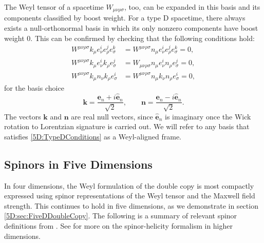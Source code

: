 The Weyl tensor of a spacetime $W_{\mu \nu \rho \sigma}$, too, can be expanded in this basis and its components
classified by boost weight. For a type D spacetime, there always exists a null-orthonormal basis in which its only
nonzero components have boost weight $0$. This can be confirmed by checking that the following conditions hold:
\cite{Hamamoto:2006zf}
\begin{equation} \label{5D:TypeDConditions} 
    \begin{split}
        W^{\mu \nu \rho \sigma} k_{\mu} e_{\nu}^{i} e_{\rho}^{j} e_{\sigma}^{k} &= W^{\mu \nu \rho \sigma}
        n_{\mu}e_{\nu}^{i} e_{\rho}^{j} e_{\sigma}^{k} = 0, \\
        W^{\mu \nu \rho \sigma} k_{\mu} e_{\nu}^{i} k_{\rho}e_{\sigma}^{j} &= W_{\mu \nu \rho \sigma} n_{\mu}
        e_{\nu}^{i} n_{\rho} e_{\sigma}^{j} = 0, \\
        W^{\mu \nu \rho \sigma} k_{\mu} n_{\nu}k_{\rho} e_{\sigma}^{i} &= W^{\mu \nu \rho \sigma} n_{\mu}
        k_{\nu}n_{\rho} e_{\sigma}^{i} = 0,
    \end{split}
\end{equation}
%
for the basis choice
%
\begin{equation} 
    \mathbf{k} = \frac{\mathbf{e}_{n} + i \mathbf{\hat{e}}_{n}}{\sqrt{2} }, \qquad \mathbf{n} =
    \frac{\mathbf{e}_{n} - i \mathbf{\hat{e}}_{n}}{\sqrt{2} }.
\end{equation}
%
The vectors $\mathbf{k}$ and $\mathbf{n}$ are real null vectors, since $\mathbf{\hat{e}}_{n}$ is imaginary once the Wick rotation to Lorentzian signature is
carried out. We will refer to any basis that satisfies \eqref{5D:TypeDConditions} as a Weyl-aligned frame.

\subsection{Spinors in Five Dimensions} \label{5D:sec:ReviewSpinors5D} 
In four dimensions, the Weyl formulation of the double copy is most compactly expressed using spinor representations
of the Weyl tensor and the Maxwell field strength. This continues to hold in five dimensions, as we demonstrate in
section \ref{5D:sec:FiveDDoubleCopy}. The following is a summary of relevant spinor definitions from
\cite{Monteiro:2018xev}. See \cite{Cheung:2009dc,Caron-Huot:2010nes,Czech:2011dk,Boels:2012ie} for more on the
spinor-helicity formalism in higher dimensions.

